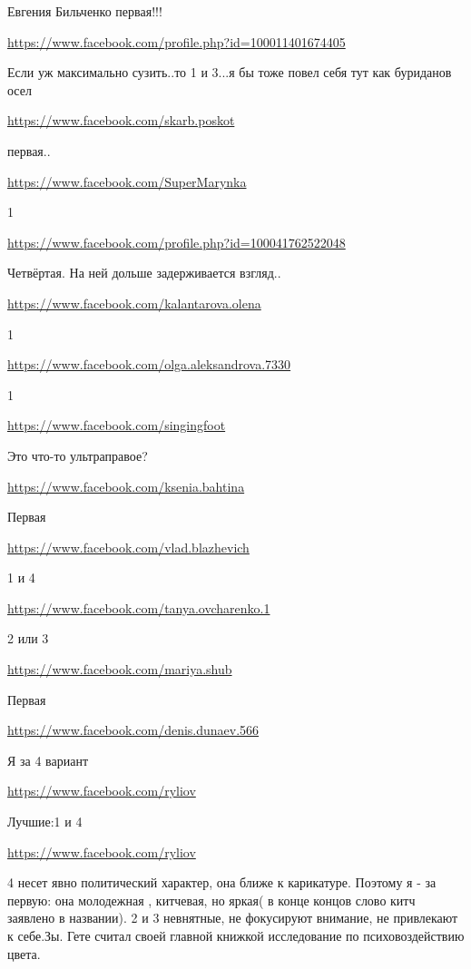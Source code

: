 \documentclass[a4paper,11pt]{extreport}
\begin{document}
\begin{itemize}
\begin{itemize}
Евгения Бильченко первая!!!

\end{itemize}
\url{https://www.facebook.com/profile.php?id=100011401674405}

Если уж максимально сузить..то 1 и 3...я бы тоже повел себя тут как буриданов осел

\url{https://www.facebook.com/skarb.poskot}

первая..

\url{https://www.facebook.com/SuperMarynka}

1

\url{https://www.facebook.com/profile.php?id=100041762522048}

Четвёртая. На ней дольше задерживается взгляд..

\url{https://www.facebook.com/kalantarova.olena}

1

\url{https://www.facebook.com/olga.aleksandrova.7330}

1

\url{https://www.facebook.com/singingfoot}

Это что-то ультраправое?

\url{https://www.facebook.com/ksenia.bahtina}

Первая

\url{https://www.facebook.com/vlad.blazhevich}

1 и 4

\url{https://www.facebook.com/tanya.ovcharenko.1}

2 или 3

\url{https://www.facebook.com/mariya.shub}

Первая

\url{https://www.facebook.com/denis.dunaev.566}

Я за 4 вариант

\url{https://www.facebook.com/ryliov}

Лучшие:1 и 4

\url{https://www.facebook.com/ryliov}

4 несет явно политический характер, она ближе к карикатуре. Поэтому я - за первую: она молодежная , китчевая, но яркая( в конце концов слово китч заявлено в названии). 2 и 3 невнятные, не фокусируют внимание, не привлекают к себе.Зы. Гете считал своей главной книжкой исследование по психовоздействию цвета.


\end{itemize}
\end{document}
